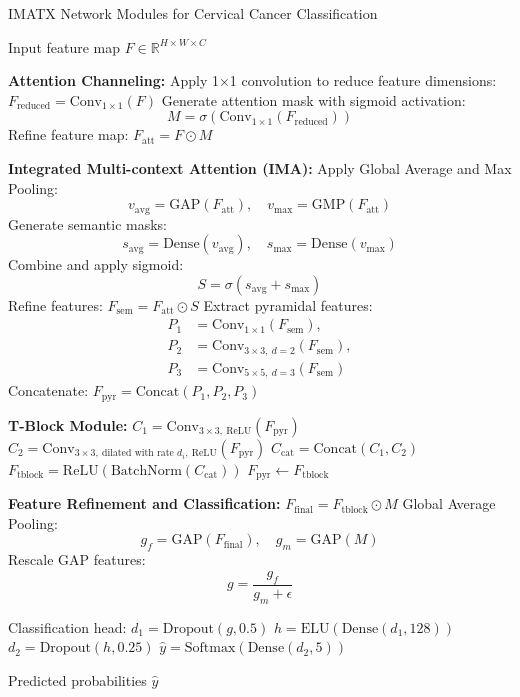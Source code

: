 \begin{algorithm}
\caption{IMATX Network Modules for Cervical Cancer Classification}
\begin{algorithmic}[1]
\REQUIRE Input feature map $F \in \mathbb{R}^{H \times W \times C}$

\STATE \textbf{Attention Channeling:}
\STATE Apply 1×1 convolution to reduce feature dimensions: $F_{\text{reduced}} = \mathrm{Conv}_{1\times1}(F)$
\STATE Generate attention mask with sigmoid activation:
\[
M = \sigma(\mathrm{Conv}_{1\times1}(F_{\text{reduced}}))
\]
\STATE Refine feature map: $F_{\text{att}} = F \odot M$

\STATE \textbf{Integrated Multi-context Attention (IMA):}
\STATE Apply Global Average and Max Pooling:
\[
v_{\text{avg}} = \mathrm{GAP}(F_{\text{att}}), \quad v_{\text{max}} = \mathrm{GMP}(F_{\text{att}})
\]
\STATE Generate semantic masks:
\[
s_{\text{avg}} = \mathrm{Dense}(v_{\text{avg}}), \quad s_{\text{max}} = \mathrm{Dense}(v_{\text{max}})
\]
\STATE Combine and apply sigmoid:
\[
S = \sigma(s_{\text{avg}} + s_{\text{max}})
\]
\STATE Refine features: $F_{\text{sem}} = F_{\text{att}} \odot S$
\STATE Extract pyramidal features:
\[
\begin{aligned}
P_1 &= \mathrm{Conv}_{1\times1}(F_{\text{sem}}), \\
P_2 &= \mathrm{Conv}_{3\times3,\ d=2}(F_{\text{sem}}), \\
P_3 &= \mathrm{Conv}_{5\times5,\ d=3}(F_{\text{sem}})
\end{aligned}
\]
\STATE Concatenate: $F_{\text{pyr}} = \mathrm{Concat}(P_1, P_2, P_3)$

\STATE \textbf{T-Block Module:}
    \STATE $C_1 = \mathrm{Conv}_{3\times3,\ \text{ReLU}}(F_{\text{pyr}})$
    \STATE $C_2 = \mathrm{Conv}_{3\times3,\ \text{dilated with rate } d_i,\ \text{ReLU}}(F_{\text{pyr}})$
    \STATE $C_{\text{cat}} = \mathrm{Concat}(C_1, C_2)$
    \STATE $F_{\text{tblock}} = \mathrm{ReLU}(\mathrm{BatchNorm}(C_{\text{cat}}))$
    \STATE $F_{\text{pyr}} \leftarrow F_{\text{tblock}}$
\ENDFOR

\STATE \textbf{Feature Refinement and Classification:}
\STATE $F_{\text{final}} = F_{\text{tblock}} \odot M$
\STATE Global Average Pooling:
\[
g_f = \mathrm{GAP}(F_{\text{final}}), \quad g_m = \mathrm{GAP}(M)
\]
\STATE Rescale GAP features:
\[
g = \frac{g_f}{g_m + \epsilon}
\]

\STATE Classification head:
\STATE $d_1 = \mathrm{Dropout}(g, 0.5)$
\STATE $h = \mathrm{ELU}(\mathrm{Dense}(d_1, 128))$
\STATE $d_2 = \mathrm{Dropout}(h, 0.25)$
\STATE $\hat{y} = \mathrm{Softmax}(\mathrm{Dense}(d_2, 5))$

\RETURN Predicted probabilities $\hat{y}$
\end{algorithmic}
\end{algorithm}
